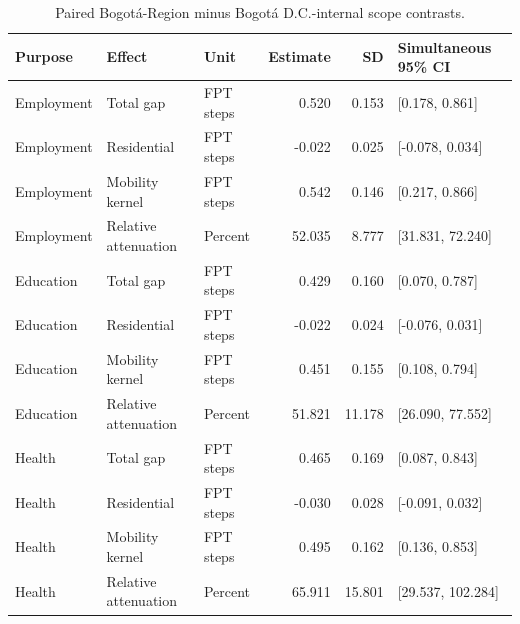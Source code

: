 \begin{table}
\caption{Paired Bogotá-Region minus Bogotá D.C.-internal scope contrasts.}
\label{tab:s7_paired}
\begin{tabular}{lllrrl}
\toprule
Purpose & Effect & Unit & Estimate & SD & Simultaneous 95\% CI \\
\midrule
Employment & Total gap & FPT steps & 0.520 & 0.153 & [0.178, 0.861] \\
Employment & Residential & FPT steps & -0.022 & 0.025 & [-0.078, 0.034] \\
Employment & Mobility kernel & FPT steps & 0.542 & 0.146 & [0.217, 0.866] \\
Employment & Relative attenuation & Percent & 52.035 & 8.777 & [31.831, 72.240] \\
Education & Total gap & FPT steps & 0.429 & 0.160 & [0.070, 0.787] \\
Education & Residential & FPT steps & -0.022 & 0.024 & [-0.076, 0.031] \\
Education & Mobility kernel & FPT steps & 0.451 & 0.155 & [0.108, 0.794] \\
Education & Relative attenuation & Percent & 51.821 & 11.178 & [26.090, 77.552] \\
Health & Total gap & FPT steps & 0.465 & 0.169 & [0.087, 0.843] \\
Health & Residential & FPT steps & -0.030 & 0.028 & [-0.091, 0.032] \\
Health & Mobility kernel & FPT steps & 0.495 & 0.162 & [0.136, 0.853] \\
Health & Relative attenuation & Percent & 65.911 & 15.801 & [29.537, 102.284] \\
\bottomrule
\end{tabular}
\end{table}
